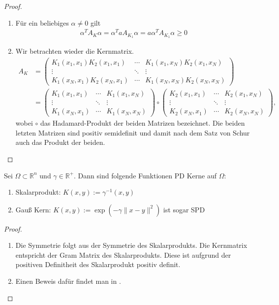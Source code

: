 \begin{proof}
\begin{enumerate}
\item
Für ein beliebiges $\alpha \neq 0$ gilt
\begin{align*}
\alpha^T A_K \alpha = \alpha^T a A_{K_1} \alpha = a \alpha^T A_{K_1} \alpha \geq 0
\end{align*}
\item
Wir betrachten wieder die Kernmatrix.
\begin{align*}
A_K &= 
\begin{pmatrix}
K_1(x_1,x_1)K_2(x_1, x_1) & \cdots & K_1(x_1,x_N)K_2(x_1, x_N) \\ 
\vdots & \ddots & \vdots \\ 
K_1(x_N,x_1)K_2(x_N, x_1) & \cdots & K_1(x_N,x_N)K_2(x_N, x_N)
\end{pmatrix} \\
&= 
\begin{pmatrix}
K_1(x_1,x_1) & \cdots & K_1(x_1,x_N) \\ 
\vdots & \ddots & \vdots \\ 
K_1(x_N,x_1) & \cdots & K_1(x_N,x_N)
\end{pmatrix}
\circ
\begin{pmatrix}
K_2(x_1, x_1) & \cdots & K_2(x_1, x_N) \\ 
\vdots & \ddots & \vdots \\ 
K_2(x_N, x_1) & \cdots & K_2(x_N, x_N)
\end{pmatrix},
\end{align*}
wobei $\circ$ das Hadamard-Produkt der beiden Matrizen bezeichnet. 
Die beiden letzten Matrizen sind positiv semidefinit und damit nach dem Satz von Schur \cite{.30.07.2018} auch das Produkt der beiden.
\end{enumerate}
\end{proof}

\begin{example}
\label{ex:Kern}
Sei $\Omega \subset \mathbb{R}^n$ und $\gamma \in \mathbb{R}^+$. Dann sind folgende Funktionen \ac{PD} Kerne auf $\Omega$:
\begin{enumerate}
\item Skalarprodukt: $K(x,y) := \gamma^{-1} (x,y)$
\item Gauß Kern: $K(x,y) := \exp\left(-\gamma \|x-y\|^2\right)$ ist sogar \ac{SPD}
\end{enumerate}
\end{example}

\begin{proof}
$\mbox{}$
\begin{enumerate}
\item
Die Symmetrie folgt aus der Symmetrie des Skalarprodukts. Die Kernmatrix entspricht der Gram Matrix des Skalarprodukts. Diese ist aufgrund der positiven Definitheit des Skalarprodukt positiv definit. 
\item
Einen Beweis dafür findet man in \textcite[Theorem 6.10]{Wendland.2005}.
\end{enumerate}
\end{proof}

